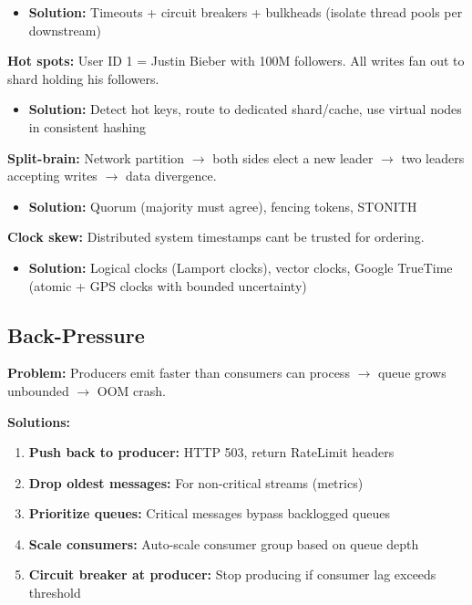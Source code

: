 \documentclass[11pt]{article}
\providecommand{\tightlist}{\setlength{\itemsep}{1pt}\setlength{\parskip}{0pt}}
\begin{document}
\begin{itemize}
\tightlist
\item
  \textbf{Solution:} Timeouts + circuit breakers + bulkheads (isolate thread pools per downstream)
\end{itemize}

\textbf{Hot spots:} User ID 1 = Justin Bieber with 100M followers. All writes fan out to shard holding his followers.

\begin{itemize}
\tightlist
\item
  \textbf{Solution:} Detect hot keys, route to dedicated shard/cache, use virtual nodes in consistent hashing
\end{itemize}

\textbf{Split-brain:} Network partition \(\rightarrow\) both sides elect a new leader \(\rightarrow\) two leaders accepting writes \(\rightarrow\) data divergence.

\begin{itemize}
\tightlist
\item
  \textbf{Solution:} Quorum (majority must agree), fencing tokens, STONITH
\end{itemize}

\textbf{Clock skew:} Distributed system timestamps can\textquotesingle t be trusted for ordering.

\begin{itemize}
\tightlist
\item
  \textbf{Solution:} Logical clocks (Lamport clocks), vector clocks, Google TrueTime (atomic + GPS clocks with bounded uncertainty)
\end{itemize}

\subsection{Back-Pressure}\label{back-pressure}

\textbf{Problem:} Producers emit faster than consumers can process \(\rightarrow\) queue grows unbounded \(\rightarrow\) OOM crash.

\textbf{Solutions:}

\begin{enumerate}
\def\labelenumi{\arabic{enumi}.}
\tightlist
\item
  \textbf{Push back to producer:} HTTP 503, return RateLimit headers
\item
  \textbf{Drop oldest messages:} For non-critical streams (metrics)
\item
  \textbf{Prioritize queues:} Critical messages bypass backlogged queues
\item
  \textbf{Scale consumers:} Auto-scale consumer group based on queue depth
\item
  \textbf{Circuit breaker at producer:} Stop producing if consumer lag exceeds threshold
\end{enumerate}
\end{document}
